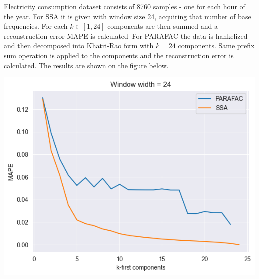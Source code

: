 \documentclass{article}
\begin{document}
Electricity consumption dataset consists of 8760 samples - one for each hour of the year. For SSA it is given with window size 24, acquiring that number of base frequencies. For each \(k \in [1, 24]\) components are then summed and a reconstruction error MAPE is calculated. For PARAFAC the data is hankelized and then decomposed into Khatri-Rao form with \(k = 24\) components. Same prefix sum operation is applied to the components and the reconstruction error is calculated. The results are shown on the figure below.

\includegraphics[scale=0.7]{./images/fig3.png}



\end{document}

